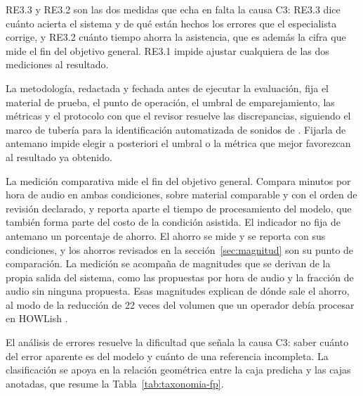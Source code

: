 RE3.3 y RE3.2 son las dos medidas que echa en falta la causa C3: RE3.3 dice cuánto
acierta el sistema y de qué están hechos los errores que el especialista corrige,
y RE3.2 cuánto tiempo ahorra la asistencia, que es además la cifra que mide el fin del objetivo general. RE3.1
impide ajustar cualquiera de las dos mediciones al resultado.

 La metodología, redactada y fechada antes de ejecutar la
evaluación, fija el material de prueba, el punto de operación, el umbral de
emparejamiento, las métricas y el protocolo con que el revisor resuelve las
discrepancias, siguiendo el marco de tubería para la identificación automatizada
de sonidos de \citet{gibb_2018}. Fijarla de antemano impide elegir a posteriori el
umbral o la métrica que mejor favorezcan al resultado ya obtenido.

 La medición comparativa mide el fin del objetivo
general. Compara minutos por hora de audio en ambas condiciones, sobre material
comparable y con el orden de revisión declarado, y reporta aparte el tiempo de
procesamiento del modelo, que también forma parte del costo de la condición
asistida. El indicador no fija de antemano un porcentaje de ahorro. El ahorro se
mide y se reporta con sus condiciones, y los ahorros revisados en la
sección~\ref{sec:magnitud} son su punto de comparación. La medición se acompaña de
magnitudes que se derivan de la propia salida del sistema, como las propuestas por
hora de audio y la fracción de audio sin ninguna propuesta. Esas magnitudes
explican de dónde sale el ahorro, al modo de la reducción de 22 veces del volumen
que un operador debía procesar en HOWLish
\citep{Campos_Krofel_Rio-Maior_Renna_2025}.

 El análisis de errores resuelve la dificultad que señala
la causa C3: saber cuánto del error aparente es del modelo y cuánto de una
referencia incompleta. La clasificación se apoya en la relación geométrica entre
la caja predicha y las cajas anotadas, que resume la Tabla~\ref{tab:taxonomia-fp}.

